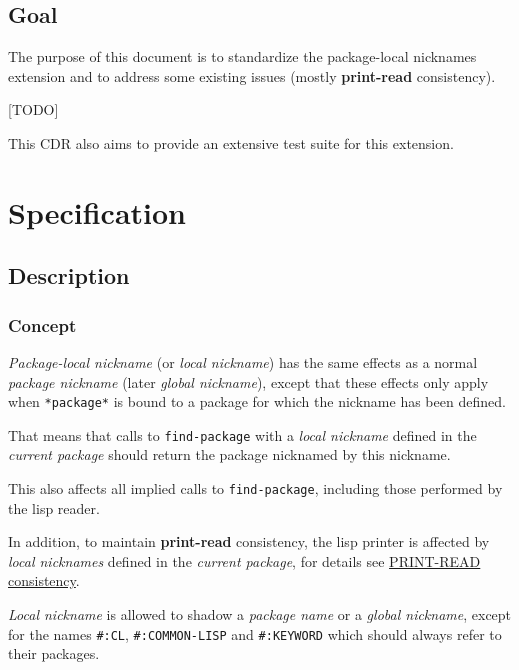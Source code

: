 \documentclass[11pt]{article}
\begin{document}
\subsection{Goal}
\label{sec:org9124e3f}
The purpose of this document is to standardize the package-local nicknames
extension and to address some existing issues (mostly \textbf{print-read}
consistency).

[TODO]

This CDR also aims to provide an extensive test suite for this extension.
\section{Specification}
\label{sec:org9ad9643}
\subsection{Description}
\label{sec:org37e0ddd}
\subsubsection{Concept}
\label{sec:orgb0798de}
\emph{Package-local nickname} (or \emph{local nickname}) has the same effects as a
normal \emph{package nickname} (later \emph{global nickname}), except that these
effects only apply when \texttt{*package*} is bound to a package for which the
nickname has been defined.

That means that calls to \texttt{find-package} with a \emph{local nickname} defined in
the \emph{current package} should return the package nicknamed by this nickname.

This also affects all implied calls to \texttt{find-package}, including those
performed by the lisp reader.

In addition, to maintain \textbf{print-read} consistency, the lisp printer is
affected by \emph{local nicknames} defined in the \emph{current package}, for details
see \hyperref[sec:orgd7be5a4]{PRINT-READ consistency}.

\emph{Local nickname} is allowed to shadow a \emph{package name} or a \emph{global
nickname}, except for the names \texttt{\#:CL}, \texttt{\#:COMMON-LISP} and \texttt{\#:KEYWORD}
which should always refer to their packages.
\end{document}

